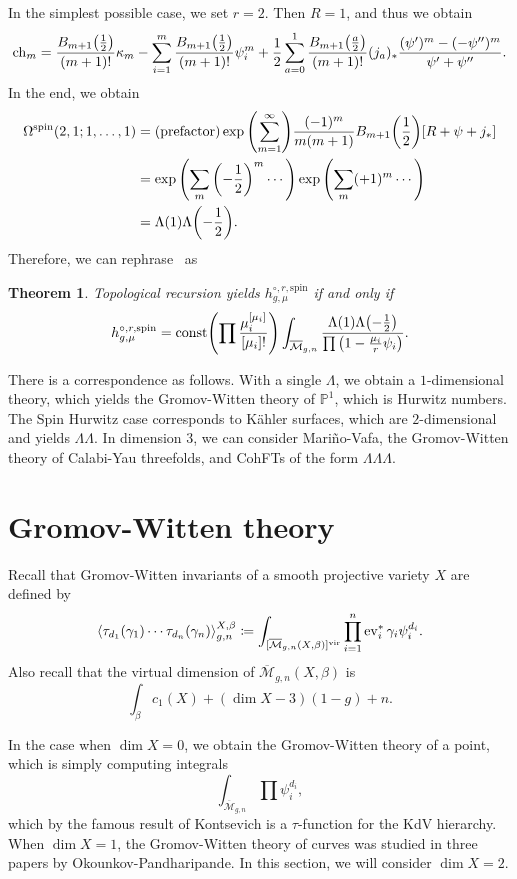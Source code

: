 \documentclass[leqno, openany]{memoir}
\theoremstyle{definition}
\theoremstyle{remark}
\theoremstyle{plain}
\newtheorem*{thm*}{Theorem}
\theoremstyle{definition}
\theoremstyle{remark}
\renewcommand{\P}{\mathbb{P}}
\newcommand{\mc}[1]{\mathcal{#1}}
\newcommand{\mr}[1]{\mathrm{#1}}
\newcommand{\on}[1]{\operatorname{#1}}
\newcommand{\ol}[1]{\overline{#1}}
\begin{document}
In the simplest possible case, we set $r=2$. Then $R=1$, and thus we obtain
\[ \on{ch}_m = \frac{B_{m+1}\qty(\frac{1}{2})}{(m+1)!} \kappa_m - \sum_{i=1}^m \frac{B_{m+1}\qty(\frac{1}{2})}{(m+1)!} \psi_i^m + \frac{1}{2} \sum_{a=0}^{1} \frac{B_{m+1}\qty(\frac{a}{2})}{(m+1)!} (j_a)_* \frac{(\psi')^m - (-\psi'')^m}{\psi' + \psi''}. \]
In the end, we obtain
\begin{align*}
  \Omega^{\mr{spin}}(2,1;1,\ldots,1) &= (\text{prefactor}) \exp \qty(\sum_{m=1}^{\infty}) \frac{(-1)^m}{m(m+1)} B_{m+1}\qty(\frac{1}{2}) [R+\psi + j_*] \\
                                     &= \exp\qty(\sum_m \qty(-\frac{1}{2})^m \cdots) \exp \qty(\sum_m (+1)^m \cdots) \\
                                     &= \Lambda(1) \Lambda\qty(-\frac{1}{2}).
\end{align*}
Therefore, we can rephrase~ as
\begin{thm*}
Topological recursion yields $h_{g,\mu}^{\circ, r, \mr{spin}}$ if and only if
  \[ h_{g,\mu}^{\circ, r,\mr{spin}} = \mr{const} \qty(\prod \frac{\mu_i^{[\mu_i]}}{[\mu_i]!}) \int_{\ol{\mc{M}}_{g,n}} \frac{\Lambda(1) \Lambda\qty(-\frac{1}{2})}{\prod \qty(1-\frac{\mu_i}{r} \psi_i)}. \]
\end{thm*}

There is a correspondence as follows. With a single $\Lambda$, we obtain a $1$-dimensional theory, which yields the Gromov-Witten theory of $\P^1$, which is Hurwitz numbers. The Spin Hurwitz case corresponds to K\"ahler surfaces, which are $2$-dimensional and yields $\Lambda \Lambda$. In dimension $3$, we can consider Mari\~no-Vafa, the Gromov-Witten theory of Calabi-Yau threefolds, and CohFTs of the form $\Lambda \Lambda \Lambda$.

\section{Gromov-Witten theory}
\label{sec:gw}

Recall that Gromov-Witten invariants of a smooth projective variety $X$ are defined by
\[ \ev{\tau_{d_1}(\gamma_1) \cdots \tau_{d_n}(\gamma_n)}_{g,n}^{X,\beta} \coloneqq \int_{[\ol{\mc{M}}_{g,n}(X,\beta)]^{\mr{vir}}} \prod_{i=1}^n \on{ev}_i^* \gamma_i \psi_i^{d_i}. \]
Also recall that the virtual dimension of $\ol{\mc{M}}_{g,n}(X,\beta)$ is
\[ \int_{\beta} c_1(X) + (\dim X - 3)(1-g) + n. \]

In the case when $\dim X = 0$, we obtain the Gromov-Witten theory of a point, which is simply computing integrals
\[ \int_{\ol{\mc{M}}_{g,n}} \prod \psi_i^{d_i}, \]
which by the famous result of Kontsevich is a $\tau$-function for the KdV hierarchy. When $\dim X = 1$, the Gromov-Witten theory of curves was studied in three papers by Okounkov-Pandharipande. In this section, we will consider $\dim X = 2$.
\end{document}
